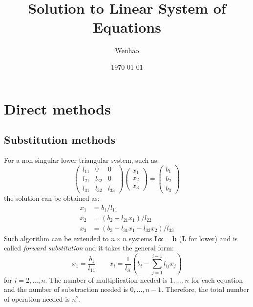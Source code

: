 \documentclass{article}
\begin{document}
\title{Solution to Linear System of Equations}
\author{Wenhao}
\date{\today}
\maketitle

\section{Direct methods}

\subsection{Substitution methods}
For a non-singular lower triangular system, such as:
\begin{equation*}
    \left(\begin{matrix}
        l_{11} & 0 & 0 \\
        l_{21} & l_{22} & 0 \\
        l_{31} & l_{32} & l_{33} 
    \end{matrix}\right)
    \left(\begin{matrix}
        x_1 \\ x_2 \\ x_3
    \end{matrix}\right) = 
    \left(\begin{matrix}
        b_1 \\ b_2 \\ b_3
    \end{matrix}\right)
\end{equation*}
the solution can be obtained as:
\begin{align*}
    x_1 &= b_1 / l_{11} \\
    x_2 &= (b_2 - l_{21} x_1 ) / l_{22} \\
    x_3 &= (b_3 - l_{31} x_1 - l_{32} x_2) / l_{33}
\end{align*}
Such algorithm can be extended to $n\times n$ systems 
$\mathbf{L}\mathbf{x} = \mathbf{b}$ ($\mathbf{L}$ for lower)
and is called \emph{forward substitution}
and it takes the general form:
\begin{equation}
    \label{forward_substitution}
    x_1 = \frac{b_1}{l_{11}} \qquad
    x_i = \frac{1}{l_{ii}} \left(b_i - \sum_{j = 1}^{i-1} l_{ij}x_j\right) 
\end{equation}
for $i = 2, \dots, n$. The number of multiplication needed is $1, \dots, n$ for each 
equation and the number of substraction needed is $0, \dots, n-1$. Therefore, the total 
number of operation needed is $n^2$. 
\end{document}
